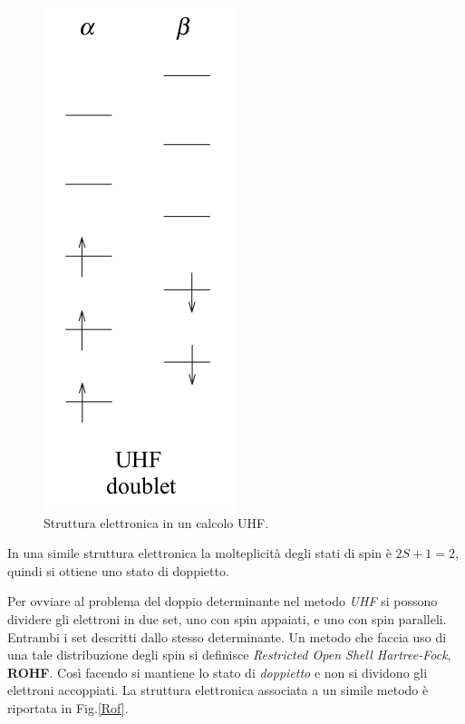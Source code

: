 \documentclass[oneside]{amsbook}
\numberwithin{section}{chapter}
\numberwithin{equation}{section}
\numberwithin{figure}{section}
\begin{document}
\begin{itemize}
\begin{figure}[H]
\centering
\caption{Struttura elettronica in un calcolo UHF.}\label{uhf}
\includegraphics[scale=0.25]{uhf}
\end{figure}

In una simile struttura elettronica la molteplicità degli stati di spin è $2S+1=2$, quindi si ottiene uno stato di doppietto.
\end{itemize}
Per ovviare al problema del doppio determinante nel metodo \emph{UHF} si possono dividere gli elettroni in due set, uno con spin appaiati, e uno con spin paralleli. Entrambi i set descritti dallo stesso determinante.
Un metodo che faccia uso di una tale distribuzione degli spin si definisce \emph{Restricted Open Shell Hartree-Fock}, \textbf{ROHF}. Così facendo si mantiene lo stato di \emph{doppietto} e non si dividono gli elettroni accoppiati. La struttura elettronica associata a un simile metodo è riportata in Fig.\ref{Rof}.
\end{document}
